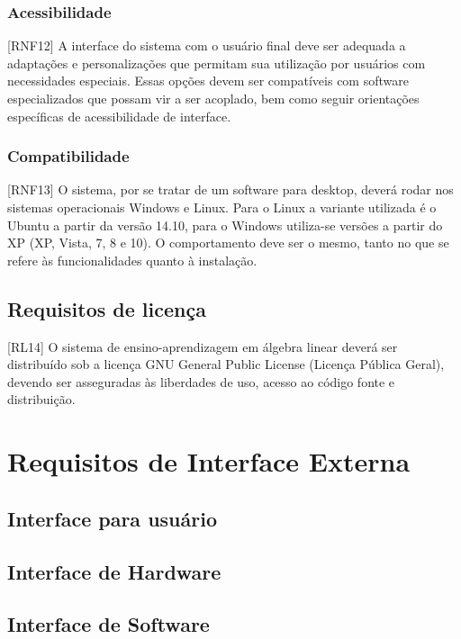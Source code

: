 \documentclass{scrreprt}
\begin{document}
\subsubsection{Acessibilidade}
[RNF12] A interface do sistema com o usuário final deve ser adequada a adaptações e personalizações que permitam sua utilização por usuários com necessidades especiais. Essas opções devem ser compatíveis com software especializados que possam vir a ser acoplado, bem como seguir orientações específicas de acessibilidade de interface.

\subsubsection{Compatibilidade}
[RNF13] O sistema, por se tratar de um software para desktop, deverá rodar nos sistemas operacionais Windows e Linux. Para o Linux a variante utilizada é o Ubuntu a partir da versão 14.10, para o Windows utiliza-se versões a partir do XP (XP, Vista, 7, 8 e 10). O comportamento deve ser o mesmo, tanto no que se refere às funcionalidades quanto à instalação.

\subsection{Requisitos de licença}
[RL14] O sistema de ensino-aprendizagem em álgebra linear deverá ser distribuído sob a licença GNU General Public License (Licença Pública Geral), devendo ser asseguradas às liberdades de uso, acesso ao código fonte e distribuição.

\section{Requisitos de Interface Externa}
\subsection{Interface para usuário}
\subsection{Interface de Hardware}
\subsection{Interface de Software}
\end{document}

